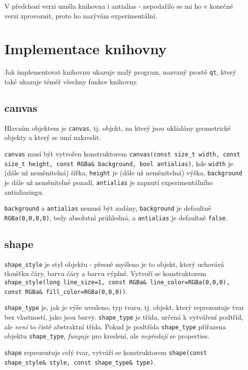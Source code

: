 \documentclass[11pt]{article} %
\begin{document}
V předchozí verzi uměla knihovna i antialias - nepodařilo se mi ho v konečné verzi zprovoznit, proto ho nazývám experimentální.

\section{Implementace knihovny}

Jak implementovat knihovnu ukazuje malý program, nazvaný prostě \texttt{qt}, který také ukazuje téměř všechny funkce knihovny.


\subsection{canvas}
Hlavním objektem je \texttt{canvas}, tj. objekt, na který jsou ukládány geometrické objekty a který se umí nakreslit. 

\texttt{canvas} musí být vytvořen konstruktorem \texttt{canvas(const size\_t width, const size\_t height, const RGBa\& background, bool antialias)}, kde \texttt{width} je (dále už neměnitelná) šířka, \texttt{height} je (dále už neměnitelná) výška, \texttt{background} je dále už neměnitelné pozadí, \texttt{antialias} je zapnutí experimentálního antialiasingu.

\texttt{background} a \texttt{antialias} nemusí být zadány, \texttt{background} je defaultně \texttt{RGBa(0,0,0,0)}, tedy absolutní průhledná, a \texttt{antialias} je defaultně \texttt{false}.

\subsection{shape}
\texttt{shape\_style} je styl objektu - přesně myšleno je to objekt, který uchovává tloušťku čáry, barvu čáry a barvu výplně. Vytvoří se konstruktorem \texttt{shape\_style(long line\_size=1, const RGBa\& line\_color=RGBa(0,0,0), const RGBa\& fill\_color=RGBa(0,0,0))}.

\texttt{shape\_type} je, jak je výše uvedeno, typ tvaru, tj. objekt, který reprezentuje tvar bez vlastností, jako jsou barvy. \texttt{shape\_type} je třída, určená k vytváření podtříd, ale \emph{není} to čistě abstraktní třída. Pokud je podtřída \texttt{shape\_type} přiřazena objektu \texttt{shape\_type}, \emph{funguje} pro kreslení, ale \emph{nepředají} se properties.

\texttt{shape} reprezentuje celý tvar, vytváří se konstruktorem \texttt{shape(const shape\_style\& style, const shape\_type\& type)}.
\end{document}
